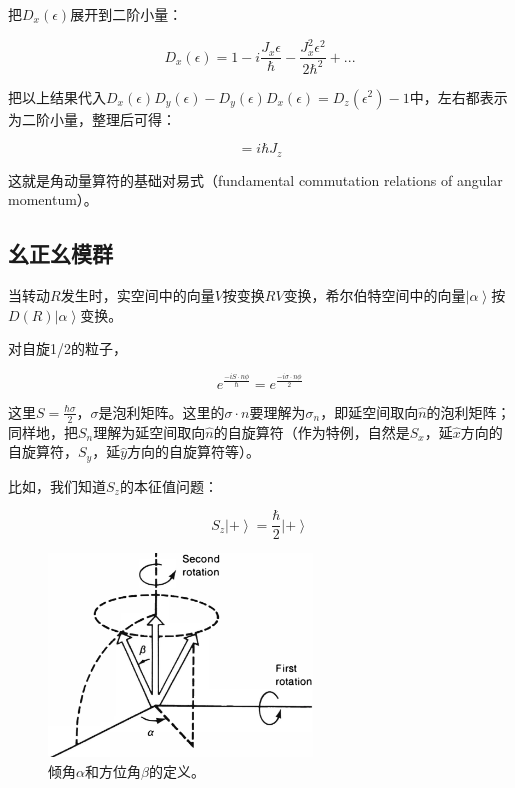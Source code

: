 把$D_x( \epsilon )$展开到二阶小量：

\begin{equation}
D_x( \epsilon ) = 1- i \frac{J_x \epsilon }{ \hbar } - \frac{ J_x^2 \epsilon^2  }{2 \hbar^2} + ...
\end{equation}

把以上结果代入$D_x(\epsilon) D_y(\epsilon) - D_y(\epsilon)  D_x(\epsilon)  = D_z(\epsilon^2 ) - 1  $中，左右都表示为二阶小量，整理后可得：

\begin{equation}
[ J_x, J_y ] = i \hbar J_z
\end{equation}

这就是角动量算符的基础对易式（fundamental commutation relations of angular momentum）。

\subsection{幺正幺模群}

当转动$R$发生时，实空间中的向量$V$按变换$RV$变换，希尔伯特空间中的向量$\left| \alpha \right\rangle$按$D(R) \left| \alpha \right\rangle$变换。

对自旋1/2的粒子，

\begin{equation}
e^{\frac{-i S \cdot n \phi}{\hbar}} = e^{ \frac{ - i \sigma \cdot n \phi }{2} }
\end{equation}


这里$S = \frac{\hbar \sigma}{2} $，$\sigma$是泡利矩阵。这里的$\sigma \cdot n$要理解为$\sigma_n$，即延空间取向$\hat n $的泡利矩阵；同样地，把$S_n$理解为延空间取向$\hat n$的自旋算符（作为特例，自然是$S_x$，延$\hat x$方向的自旋算符，$S_y$，延$\hat y$方向的自旋算符等）。

比如，我们知道$S_z$的本征值问题：

\begin{equation}
S_z \left| + \right\rangle = \frac{\hbar}{2} \left| + \right\rangle
\end{equation}

\begin{figure}[htbp]
\begin{center}
\includegraphics[width=7cm]{AngularMomentum/alphabeta.png}
\caption{倾角$\alpha$和方位角$\beta$的定义。}
\end{center}
\end{figure}

